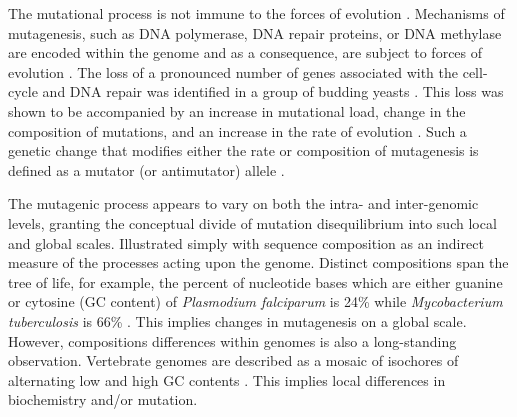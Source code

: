 The mutational process is not immune to the forces of evolution \citep{Lynch2016GeneticRate}. Mechanisms of mutagenesis, such as DNA polymerase, DNA repair proteins, or DNA methylase are encoded within the genome and as a consequence, are subject to forces of evolution \citep{Lynch2010EvolutionRate}. The loss of a pronounced number of genes associated with the cell-cycle and DNA repair was identified in a group of budding yeasts \citep{Steenwyk2019ExtensiveYeasts}. This loss was shown to be accompanied by an increase in mutational load, change in the composition of mutations, and an increase in the rate of evolution \citep{Steenwyk2019ExtensiveYeasts}. Such a genetic change that modifies either the rate or composition of mutagenesis is defined as a mutator (or antimutator) allele \citep{Lynch2016GeneticRate}.

The mutagenic process appears to vary on both the intra- and inter-genomic levels, granting the conceptual divide of mutation disequilibrium into such local and global scales. Illustrated simply with sequence composition as an indirect measure of the processes acting upon the genome. Distinct compositions span the tree of life, for example, the percent of nucleotide bases which are either guanine or cytosine (GC content) of \textit{Plasmodium falciparum} is 24\% while \textit{Mycobacterium tuberculosis} is  66\% \citep{Nakamura2000Codon2000}. This implies changes in mutagenesis on a global scale. However, compositions differences within genomes is also a long-standing observation. Vertebrate genomes are described as a mosaic of isochores of alternating low and high GC contents \citep{Bernardi1989TheGenome, Bernardi2000IsochoresVertebrates}. This implies local differences in biochemistry and/or mutation. 


